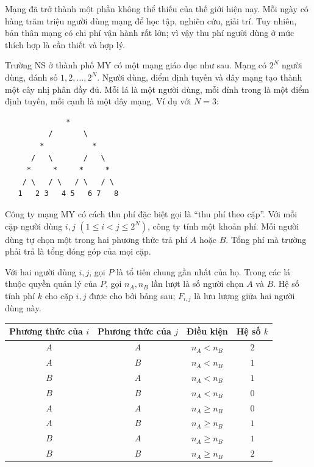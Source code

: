 \documentclass[11pt]{article}
\begin{document}
Mạng đã trở thành một phần không thể thiếu của thế giới hiện nay. Mỗi ngày có
hàng trăm triệu người dùng mạng để học tập, nghiên cứu, giải trí. Tuy nhiên,
bản thân mạng có chi phí vận hành rất lớn; vì vậy thu phí người dùng ở mức
thích hợp là cần thiết và hợp lý.

Trường NS ở thành phố MY có một mạng giáo dục như sau. Mạng có \(2^N\) người
dùng, đánh số \(1,2,\ldots,2^N\). Người dùng, điểm định tuyến và dây mạng tạo
thành một cây nhị phân đầy đủ. Mỗi lá là một người dùng, mỗi đỉnh trong là một
điểm định tuyến, mỗi cạnh là một dây mạng. Ví dụ với \(N=3\):

\begin{verbatim}
              *
          /       \
        *           *
      /   \       /   \
     *     *     *     *
    / \   / \   / \   / \
   1   2 3   4 5   6 7   8
\end{verbatim}

Công ty mạng MY có cách thu phí đặc biệt gọi là ``thu phí theo cặp''. Với mỗi
cặp người dùng \(i,j\) \((1\le i<j\le 2^N)\), công ty tính một khoản phí. Mỗi
người dùng tự chọn một trong hai phương thức trả phí \(A\) hoặc \(B\). Tổng
phí mà trường phải trả là tổng đóng góp của mọi cặp.

Với hai người dùng \(i,j\), gọi \(P\) là tổ tiên chung gần nhất của họ. Trong
các lá thuộc quyền quản lý của \(P\), gọi \(n_A,n_B\) lần lượt là số người
chọn \(A\) và \(B\). Hệ số tính phí \(k\) cho cặp \(i,j\) được cho bởi bảng
sau; \(F_{i,j}\) là lưu lượng giữa hai người dùng này.

\begin{center}
\begin{tabular}{c c c c}
\hline
Phương thức của \(i\) & Phương thức của \(j\) & Điều kiện & Hệ số \(k\)\\
\hline
\(A\) & \(A\) & \(n_A<n_B\) & \(2\)\\
\(A\) & \(B\) & \(n_A<n_B\) & \(1\)\\
\(B\) & \(A\) & \(n_A<n_B\) & \(1\)\\
\(B\) & \(B\) & \(n_A<n_B\) & \(0\)\\
\hline
\(A\) & \(A\) & \(n_A\ge n_B\) & \(0\)\\
\(A\) & \(B\) & \(n_A\ge n_B\) & \(1\)\\
\(B\) & \(A\) & \(n_A\ge n_B\) & \(1\)\\
\(B\) & \(B\) & \(n_A\ge n_B\) & \(2\)\\
\hline
\end{tabular}
\end{center}
\end{document}
